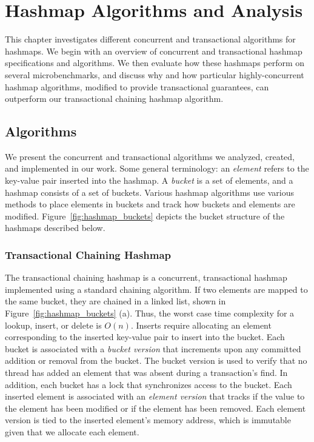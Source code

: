 \chapter{Hashmap Algorithms and Analysis}
\label{hashmap}

This chapter investigates different concurrent and transactional algorithms for hashmaps. We begin with an overview of concurrent and transactional hashmap specifications and algorithms. We then evaluate how these hashmaps perform on several microbenchmarks, and discuss why and how particular highly-concurrent hashmap algorithms, modified to provide transactional guarantees, can outperform our transactional chaining hashmap algorithm.

\section{Algorithms}

We present the concurrent and transactional algorithms we analyzed, created, and implemented in our work. Some general terminology: an \emph{element} refers to the key-value pair inserted into the hashmap. A \emph{bucket} is a set of elements, and a hashmap consists of a set of buckets. Various hashmap algorithms use various methods to place elements in buckets and track how buckets and elements are modified. Figure~\ref{fig:hashmap_buckets} depicts the bucket structure of the hashmaps described below.


\subsection{Transactional Chaining Hashmap}
The transactional chaining hashmap is a concurrent, transactional hashmap implemented using a standard chaining algorithm. If two elements are mapped to the same bucket, they are chained in a linked list, shown in Figure~\ref{fig:hashmap_buckets} (a). Thus, the worst case time complexity for a lookup, insert, or delete is $O(n)$. Inserts require allocating an element corresponding to the inserted key-value pair to insert into the bucket. Each bucket is associated with a \emph{bucket version} that increments upon any committed addition or removal from the bucket. The bucket version is used to verify that no thread has added an element that was absent during a transaction's find. In addition, each bucket has a lock that synchronizes access to the bucket. Each inserted element is associated with an \emph{element version} that tracks if the value to the element has been modified or if the element has been removed. Each element version is tied to the inserted element's memory address, which is immutable given that we allocate each element.

